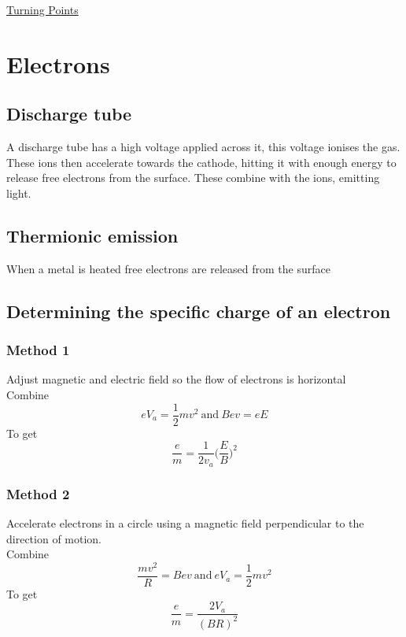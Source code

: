 \documentclass[12pt]{article}
\begin{document}
\begin{center}
\underline{\huge Turning Points}
\end{center}
\section{Electrons}
\subsection{Discharge tube}
A discharge tube has a high voltage applied across it, this voltage ionises the gas. These ions then accelerate towards the cathode, hitting it with enough energy to release free electrons from the surface. These combine with the ions, emitting light.
\subsection{Thermionic emission}
When a metal is heated free electrons are released from the surface
\subsection{Determining the specific charge of an electron}
\subsubsection{Method 1}
Adjust magnetic and electric field so the flow of electrons is horizontal\\
Combine
$$eV_a=\frac{1}{2}mv^2 \ \textrm{and} \ Bev=eE$$
To get
$$\frac{e}{m}=\frac{1}{2v_a}\Bigg(\frac{E}{B}\Bigg)^2$$
\subsubsection{Method 2}
Accelerate electrons in a circle using a magnetic field perpendicular to the direction of motion.\\
Combine
$$\frac{mv^2}{R}=Bev \ \textrm{and} \ eV_a=\frac{1}{2}mv^2$$
To get
$$\frac{e}{m}=\frac{2V_a}{(BR)^2}$$
\end{document}
